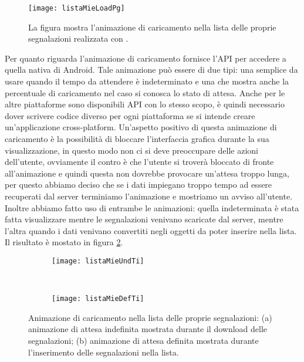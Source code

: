             \begin{figure}[H]
                \centering
                \texttt{[image: listaMieLoadPg]}
                \caption{La figura mostra l'animazione di caricamento nella lista
                delle proprie segnalazioni realizzata con \kendomob{}.
                }
                \label{fig:listaMieLoadPg}
            \end{figure}
            Per quanto riguarda l'animazione di caricamento \tisdk{} fornisce
            l'API per accedere a quella nativa di Android.
            Tale animazione può essere di due tipi: una semplice da usare quando
            il tempo da attendere è indeterminato e
            una che mostra anche la percentuale di caricamento nel caso si conosca
            lo stato di attesa.
            Anche per le altre piattaforme sono disponibili API con lo stesso scopo,
            è quindi necessario dover scrivere codice diverso per ogni piattaforma
            se si intende creare un'applicazione cross-platform.
            Un'aspetto positivo di questa animazione di caricamento è la possibilità
            di bloccare l'interfaccia grafica durante la sua visualizzazione,
            in questo modo non ci si deve preoccupare delle azioni dell'utente,
            ovviamente il contro è che l'utente si troverà bloccato di fronte
            all'animazione e quindi questa non dovrebbe provocare un'attesa troppo
            lunga, per questo abbiamo deciso che se i dati impiegano troppo tempo
            ad essere recuperati dal server terminiamo l'animazione e mostriamo
            un avviso all'utente. Inoltre abbiamo fatto uso di entrambe le animazioni:
            quella indeterminata è stata fatta visualizzare mentre le segnalazioni
            venivano scaricate dal server, mentre l'altra quando i dati venivano
            convertiti negli oggetti da poter inserire nella lista. Il risultato
            è mostato in figura \ref{fig:mieLoadTi}.

            \begin{figure}[H]
              \centering
              \begin{subfigure}[b]{0.485\textwidth}
                \texttt{[image: listaMieUndTi]}
                \caption{}
              \end{subfigure}
              ~
              \begin{subfigure}[b]{0.485\textwidth}
                \texttt{[image: listaMieDefTi]}
                \caption{}
              \end{subfigure}
              \caption{Animazione di caricamento nella lista delle proprie segnalazioni:
                (a) animazione di attesa indefinita mostrata durante il download delle
                segnalazioni; (b) animazione di attesa definita mostrata durante
                l'inserimento delle segnalazioni nella lista.
                }
              \label{fig:mieLoadTi}
            \end{figure}

